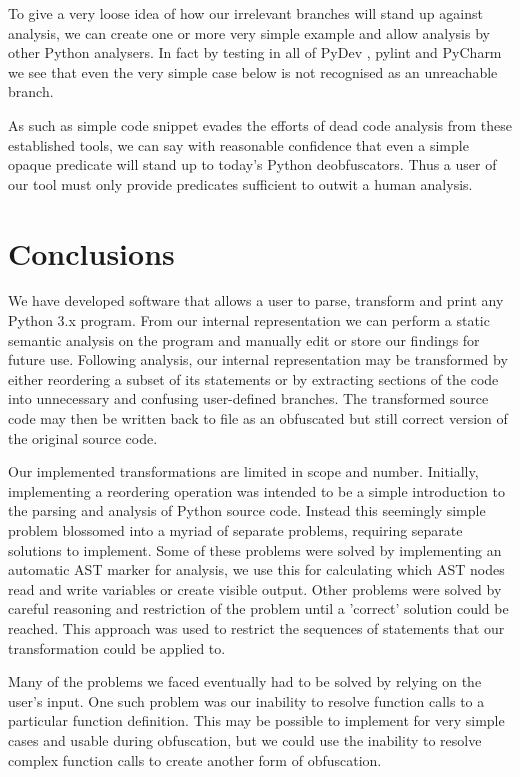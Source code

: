 \documentclass[twoside,a4paper]{report}
\begin{document}
To give a very loose idea of how our irrelevant branches will stand up against analysis, we can create one or more very simple example and allow analysis by
other Python analysers. In fact by testing in all of PyDev \cite{pydev}, pylint \cite{pylint} and PyCharm \cite{pycharm} we see that even the very
simple case below is not recognised as an unreachable branch.



As such as simple code snippet evades the efforts of dead code analysis from these established tools, we can say with reasonable confidence that even a
simple opaque predicate will stand up to today's Python deobfuscators. Thus a user of our tool must only provide predicates sufficient to outwit a human
analysis.

\section{Conclusions}

We have developed software that allows a user to parse, transform and print any Python 3.x program. From our internal representation we can perform a static
semantic analysis on the program and manually edit or store our findings for future use. Following analysis, our internal representation may be transformed
by either reordering a subset of its statements or by extracting sections of the code into unnecessary and confusing user-defined branches. The transformed
source code may then be written back to file as an obfuscated but still correct version of the original source code.

Our implemented transformations are limited in scope and number. Initially, implementing a reordering operation was intended to be a simple introduction
to the parsing and analysis of Python source code. Instead this seemingly simple problem blossomed into a myriad of separate problems, requiring separate
solutions to implement. Some of these problems were solved by implementing an automatic AST marker for analysis, we use this for calculating which AST nodes
read and write variables or create visible output. Other problems were solved by careful reasoning and restriction of the problem until a 'correct' solution
could be reached. This approach was used to restrict the sequences of statements that our transformation could be applied to.

Many of the problems we faced eventually had to be solved by relying on the user's input. One such problem was our inability to resolve function calls to a
particular function definition. This may be possible to implement for very simple cases and usable during obfuscation, but we could use the inability to
resolve complex function calls to create another form of obfuscation.
\end{document}
